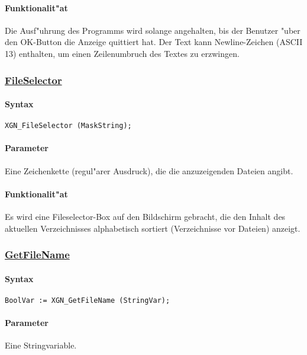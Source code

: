 \paragraph{Funktionalit"at}
Die Ausf"uhrung des Programms wird solange angehalten, bis der Benutzer
"uber den OK-Button die Anzeige quittiert hat. Der Text kann Newline-Zeichen
(ASCII 13) enthalten, um einen Zeilenumbruch des Textes zu erzwingen.



\subsubsection{\underline{FileSelector}}

\paragraph{Syntax}
\begin{verbatim}
XGN_FileSelector (MaskString);
\end{verbatim}

\paragraph{Parameter}
Eine Zeichenkette (regul"arer Ausdruck), die die anzuzeigenden Dateien angibt.

\paragraph{Funktionalit"at}
Es wird eine Fileselector-Box auf den Bildschirm gebracht, die den Inhalt des
aktuellen Verzeichnisses alphabetisch sortiert (Verzeichnisse vor Dateien)
anzeigt.

\subsubsection{\underline{GetFileName}}

\paragraph{Syntax}
\begin{verbatim}
BoolVar := XGN_GetFileName (StringVar);
\end{verbatim}

\paragraph{Parameter}
Eine Stringvariable.

